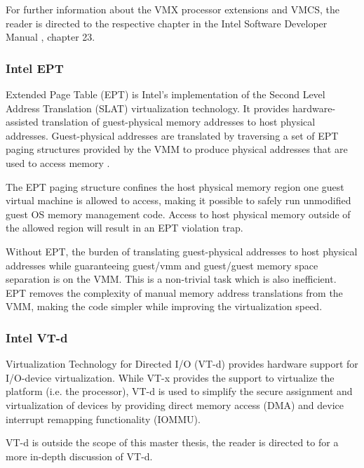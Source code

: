 For further information about the VMX processor extensions and VMCS, the reader
is directed to the respective chapter in the Intel Software Developer
Manual \cite{IntelSDM}, chapter 23.

\subsubsection{Intel EPT}\label{subsubsec:ept}
Extended Page Table (EPT) is Intel's implementation of the Second
Level Address Translation (SLAT) virtualization technology. It
provides hardware-assisted translation of guest-physical memory addresses to
host physical addresses. Guest-physical addresses are translated by traversing a
set of EPT paging structures provided by the VMM to produce physical addresses
that are used to access memory \cite{IntelSDM}.

The EPT paging structure confines the host physical memory region one guest
virtual machine is allowed to access, making it possible to safely run
unmodified guest OS memory management code. Access to host physical memory
outside of the allowed region will result in an EPT violation trap.

Without EPT, the burden of translating guest-physical addresses to host physical
addresses while guaranteeing guest/vmm and guest/guest memory space separation
is on the VMM. This is a non-trivial task which is also inefficient. EPT removes
the complexity of manual memory address translations from the VMM, making the
code simpler while improving the virtualization speed.

\subsubsection{Intel VT-d}\label{subsubsec:vtd}
Virtualization Technology for Directed I/O (VT-d) provides hardware
support for I/O-device virtualization. While VT-x provides the support to
virtualize the platform (i.e. the processor), VT-d is used to simplify the
secure assignment and virtualization of devices by providing direct memory
access (DMA) and device interrupt remapping functionality
(IOMMU).

VT-d is outside the scope of this master thesis, the reader is directed to
\cite{IntelVTd} for a more in-depth discussion of VT-d.

